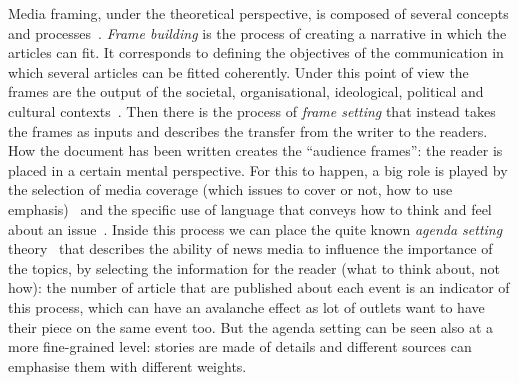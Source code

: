 Media framing, under the theoretical perspective, is composed of several concepts and processes~\cite{scheufele2007framing}.
\textit{Frame building} is the process of creating a narrative in which the articles can fit. It corresponds to defining the objectives of the communication in which several articles can be fitted coherently. Under this point of view the frames are the output of the societal, organisational, ideological, political and cultural contexts~\cite{scheufele1999framing}.
Then there is the process of \textit{frame setting} that instead takes the frames as inputs and describes the transfer from the writer to the readers. How the document has been written creates the ``audience frames'': the reader is placed in a certain mental perspective. For this to happen, a big role is played by the selection of media coverage (which issues to cover or not, how to use emphasis)~\cite{iyengar1994anyone} and the specific use of language that conveys how to think and feel about an issue~\cite{bryant2012fundamentals}.
Inside this process we can place the quite known \emph{agenda setting} theory~\cite{mccombs1972agenda} that describes the ability of news media to influence the importance of the topics, by selecting the information for the reader (what to think about, not how): %
the number of article that are published about each event is an indicator of this process, which can have an avalanche effect as lot of outlets want to have their piece on the same event too.
But the agenda setting can be seen also at a more fine-grained level: stories are made of details and different sources can emphasise them with different weights.


